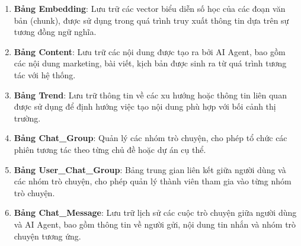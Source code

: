 \begin{enumerate}
  \textbf{Bảng Chunk}: Lưu trữ các đoạn văn bản được chia nhỏ từ các tài
  liệu. Mỗi tài liệu được phân chia thành các đoạn văn bản có kích thước
  phù hợp để xử lý và tạo embedding.
\item
  \textbf{Bảng Embedding}: Lưu trữ các vector biểu diễn số học của các
  đoạn văn bản (chunk), được sử dụng trong quá trình truy xuất thông tin
  dựa trên sự tương đồng ngữ nghĩa.
\item
  \textbf{Bảng Content}: Lưu trữ các nội dung được tạo ra bởi AI Agent,
  bao gồm các nội dung marketing, bài viết, kịch bản được sinh ra từ quá
  trình tương tác với hệ thống.
\item
  \textbf{Bảng Trend}: Lưu trữ thông tin về các xu hướng hoặc thông tin
  liên quan được sử dụng để định hướng việc tạo nội dung phù hợp với bối
  cảnh thị trường.
\item
  \textbf{Bảng Chat\_Group}: Quản lý các nhóm trò chuyện, cho phép tổ
  chức các phiên tương tác theo từng chủ đề hoặc dự án cụ thể.
\item
  \textbf{Bảng User\_Chat\_Group}: Bảng trung gian liên kết giữa người
  dùng và các nhóm trò chuyện, cho phép quản lý thành viên tham gia vào
  từng nhóm trò chuyện.
\item
  \textbf{Bảng Chat\_Message}: Lưu trữ lịch sử các cuộc trò chuyện giữa
  người dùng và AI Agent, bao gồm thông tin về người gửi, nội dung tin
  nhắn và nhóm trò chuyện tương ứng.
\end{enumerate}

